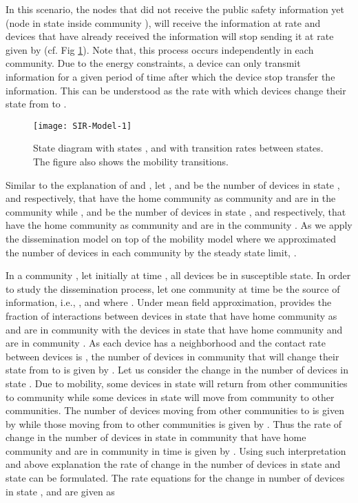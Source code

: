 \documentclass[review]{elsarticle}
\begin{document}
In this scenario, the nodes that did not receive the public safety information yet (node in state  inside community ), will receive the information at rate  and devices that have already received the information will stop sending it at rate given by  (cf. Fig \ref{fig:SIR1}). Note that, this process occurs independently in each community. Due to the energy constraints, a device can only transmit information for a given period of time after which the device stop transfer the information. This can be understood as the rate with which devices change their state from  to .

\begin{figure}\centering
    \texttt{[image: SIR-Model-1]}
    \caption{State diagram with states ,  and  with transition rates between states. The figure also shows the mobility transitions.}
    \label{fig:SIR1}
\end{figure}

Similar to the explanation of  and , let ,  and  be the number of devices in state ,  and  respectively, that have the home community as community  and are in the community  while ,  and  be the number of devices in state ,  and  respectively, that have the home community as community  and are in the community . As we apply the dissemination model on top of the mobility model where we approximated the number of devices in each community by the steady state limit, .

In a community , let initially at time , all devices be in susceptible state. In order to study the dissemination process, let one community  at time  be the source of information, i.e., ,  and  where . Under mean field approximation,  provides the fraction of interactions between devices in state  that have home community as  and are in community  with the devices in state  that have home community  and are in community . As each device has a neighborhood  and the contact rate between devices is , the number of devices in community  that will change their state from  to  is given by . Let us consider the change in the number of devices in state . Due to mobility, some devices in state  will return from other communities to community  while some devices in state  will move from community  to other communities. The number of devices moving from other communities to  is given by  while those moving from  to other communities is given by . Thus the rate of change in the number of devices in state  in community  that have home community  and are in community  in  time is given by . Using such interpretation and above explanation the rate of change in the number of devices in state  and state  can be formulated. The rate equations for the change in number of devices in state ,  and  are given as
\end{document}
